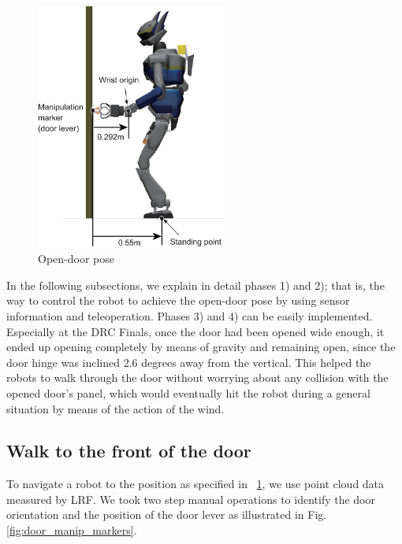 \begin{figure}[t]
  \centering
  \includegraphics[width = 6.25cm]{img/door_approaching_config}
  \caption{Open-door pose}
  \label{fig:door_approaching_config}
\end{figure}



In the following subsections, we explain in detail phases 1) and 2); that is,
the way to control the robot to achieve the open-door pose by using sensor information
and teleoperation.
Phases 3) and 4) can be easily implemented. 
Especially at the DRC Finals, once the door had been opened wide enough, it ended up opening
completely by means of gravity and remaining open, since the door hinge was inclined 2.6 degrees
away from the vertical.
This helped the robots to walk through the door without worrying about any collision with
the opened door's panel, which would eventually hit the robot during a general situation
by means of the action of the wind. 

\subsection{Walk to the front of the door}
%
To navigate a robot to the position as specified in \figurename~\ref{fig:door_approaching_config}, we use
point cloud data measured by LRF. 
We took two step manual operations to identify the door orientation and the position of the door lever 
as illustrated in Fig.\ref{fig:door_manip_markers}.

